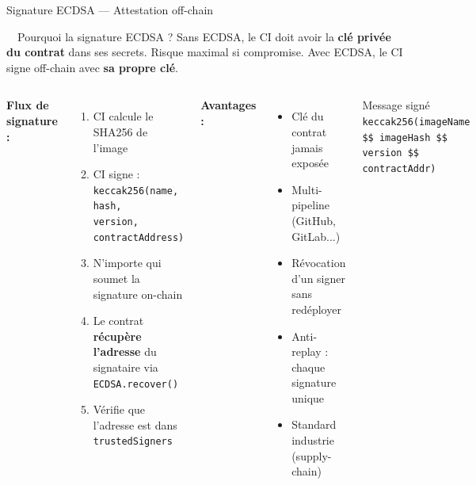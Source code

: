 \documentclass[aspectratio=169]{beamer}
\begin{document}
\begin{frame}{Signature ECDSA — Attestation off-chain}

  \begin{block}{\faShieldAlt\ \ Pourquoi la signature ECDSA ?}
    Sans ECDSA, le CI doit avoir la \textbf{clé privée du contrat} dans ses secrets.
    Risque maximal si compromise. Avec ECDSA, le CI signe off-chain avec \textbf{sa propre clé}.
  \end{block}

  \vspace{0.3cm}

  \begin{columns}[T]
      \textbf{Flux de signature :}
      \begin{enumerate}
        \item CI calcule le SHA256 de l'image
        \item CI signe : \texttt{keccak256(name, hash,}\\\texttt{version, contractAddress)}
        \item N'importe qui soumet la signature on-chain
        \item Le contrat \textbf{récupère l'adresse} du signataire via \texttt{ECDSA.recover()}
        \item Vérifie que l'adresse est dans \texttt{trustedSigners}
      \end{enumerate}

      \textbf{Avantages :}
      \begin{itemize}
        \item[\faCheckCircle] Clé du contrat jamais exposée
        \item[\faCheckCircle] Multi-pipeline (GitHub, GitLab...)
        \item[\faCheckCircle] Révocation d'un signer sans redéployer
        \item[\faCheckCircle] Anti-replay : chaque signature unique
        \item[\faCheckCircle] Standard industrie (supply-chain)
      \end{itemize}

      \vspace{0.2cm}
      \begin{exampleblock}{Message signé}
        \tiny\texttt{keccak256(imageName \$\vert\vert\$ imageHash \$\vert\vert\$ version \$\vert\vert\$ contractAddr)}
      \end{exampleblock}
  \end{columns}

\end{frame}
\end{document}
